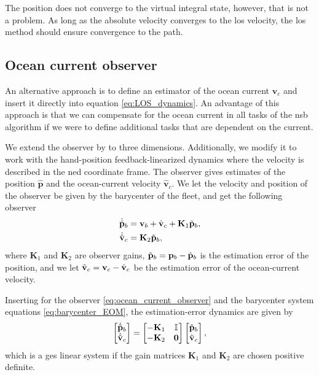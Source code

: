 The position does not converge to the virtual integral state, however, that is not a problem. As long as the absolute velocity converges to the \gls{los} velocity, the \gls{los} method should ensure convergence to the path.

\subsection{Ocean current observer}\label{sec:ocean_current_observer}
An alternative approach is to define an estimator of the ocean current $\mathbf{v}_c$ and insert it directly into equation \eqref{eq:LOS_dynamics}. An advantage of this approach is that we can
compensate for the ocean current in all tasks of the \gls{nsb} algorithm if we were to define additional tasks that are dependent on the current.

We extend the observer by \cite{aguiar_dynamic_2002} to three dimensions. Additionally, we modify it to work with the hand-position feedback-linearized dynamics where the velocity is described in the \gls{ned} coordinate frame. The observer gives estimates of the position $\hat{\mathbf{p}}$ and the ocean-current velocity $\hat{\mathbf{v}}_c$. We let the velocity and position of the observer be given by the barycenter of the fleet, and get the following observer
\begin{subequations}\label{eq:ocean_current_observer}
    \begin{align}
        \dot{\hat{\mathbf{p}}}_b &= \mathbf{v}_b + \hat{\mathbf{v}}_c + \mathbf{K}_1 \Tilde{\mathbf{p}}_b,\\
        \dot{\hat{\mathbf{v}}}_c &= \mathbf{K}_2 \Tilde{\mathbf{p}}_b,
    \end{align}
\end{subequations}
where $\mathbf{K}_1$ and $\mathbf{K}_2$ are observer gains, $\Tilde{\mathbf{p}}_b = \mathbf{p}_b - \hat{\mathbf{p}}_b$ is the estimation error of the position, and we let $\Tilde{\mathbf{v}}_c = \mathbf{v}_c-\hat{\mathbf{v}}_c$ be the estimation error of the ocean-current velocity. 

Inserting for the observer \eqref{eq:ocean_current_observer} and the barycenter system equations \eqref{eq:barycenter_EOM}, the estimation-error dynamics are given by
\begin{equation}
    \begin{bmatrix}
        \dot{\Tilde{\mathbf{p}}}_b\\
        \dot{\Tilde{\mathbf{v}}}_c
    \end{bmatrix} = \begin{bmatrix}
        -\mathbf{K}_1 & \mathbb{I}\\-\mathbf{K}_2 & \mathbf{0}
    \end{bmatrix}\begin{bmatrix}
        \Tilde{\mathbf{p}}_b\\
        \Tilde{\mathbf{v}}_c
    \end{bmatrix},
\end{equation} 
which is a \gls{ges} linear system if the gain matrices $\mathbf{K}_1$ and $\mathbf{K}_2$ are chosen positive definite.

